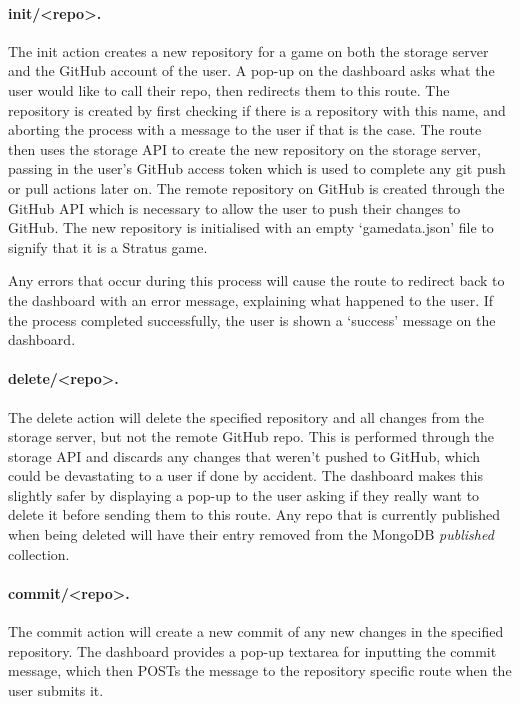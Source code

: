 	\paragraph{init/<repo>.}
	The init action creates a new repository for a game on both the storage server and the GitHub account of the user. A pop-up on the dashboard asks what the user would like to call their repo, then redirects them to this route. The repository is created by first checking if there is a repository with this name, and aborting the process with a message to the user if that is the case. The route then uses the storage API to create the new repository on the storage server, passing in the user's GitHub access token which is used to complete any git push or pull actions later on. The remote repository on GitHub is created through the GitHub API which is necessary to allow the user to push their changes to GitHub. The new repository is initialised with an empty `gamedata.json' file to signify that it is a Stratus game.

	Any errors that occur during this process will cause the route to redirect back to the dashboard with an error message, explaining what happened to the user. If the process completed successfully, the user is shown a `success' message on the dashboard.

	\paragraph{delete/<repo>.}
	The delete action will delete the specified repository and all changes from the storage server, but not the remote GitHub repo. This is performed through the storage API and discards any changes that weren't pushed to GitHub, which could be devastating to a user if done by accident. The dashboard makes this slightly safer by displaying a pop-up to the user asking if they really want to delete it before sending them to this route. Any repo that is currently published when being deleted will have their entry removed from the MongoDB \emph{published} collection.

	\paragraph{commit/<repo>.}
	The commit action will create a new commit of any new changes in the specified repository. The dashboard provides a pop-up textarea for inputting the commit message, which then POSTs the message to the repository specific route when the user submits it. 

